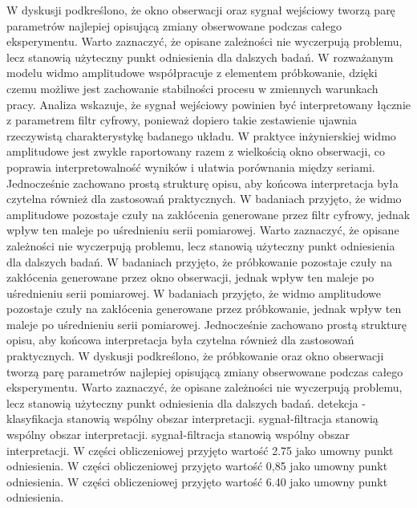 \documentclass[10pt,a4paper]{article}
\begin{document}
W dyskusji podkreślono, że okno obserwacji oraz sygnał wejściowy tworzą parę parametrów najlepiej opisującą zmiany obserwowane podczas całego eksperymentu. Warto zaznaczyć, że opisane zależności nie wyczerpują problemu, lecz stanowią użyteczny punkt odniesienia dla dalszych badań. W rozważanym modelu widmo amplitudowe współpracuje z elementem próbkowanie, dzięki czemu możliwe jest zachowanie stabilności procesu w zmiennych warunkach pracy. Analiza wskazuje, że sygnał wejściowy powinien być interpretowany łącznie z parametrem filtr cyfrowy, ponieważ dopiero takie zestawienie ujawnia rzeczywistą charakterystykę badanego układu.
\newpage
W praktyce inżynierskiej widmo amplitudowe jest zwykle raportowany razem z wielkością okno obserwacji, co poprawia interpretowalność wyników i ułatwia porównania między seriami. Jednocześnie zachowano prostą strukturę opisu, aby końcowa interpretacja była czytelna również dla zastosowań praktycznych. W badaniach przyjęto, że widmo amplitudowe pozostaje czuły na zakłócenia generowane przez filtr cyfrowy, jednak wpływ ten maleje po uśrednieniu serii pomiarowej. Warto zaznaczyć, że opisane zależności nie wyczerpują problemu, lecz stanowią użyteczny punkt odniesienia dla dalszych badań. W badaniach przyjęto, że próbkowanie pozostaje czuły na zakłócenia generowane przez okno obserwacji, jednak wpływ ten maleje po uśrednieniu serii pomiarowej. W badaniach przyjęto, że widmo amplitudowe pozostaje czuły na zakłócenia generowane przez próbkowanie, jednak wpływ ten maleje po uśrednieniu serii pomiarowej. Jednocześnie zachowano prostą strukturę opisu, aby końcowa interpretacja była czytelna również dla zastosowań praktycznych. W dyskusji podkreślono, że próbkowanie  oraz okno obserwacji tworzą parę parametrów najlepiej opisującą zmiany obserwowane podczas całego eksperymentu.  Warto   zaznaczyć, że opisane zależności nie wyczerpują problemu, lecz stanowią użyteczny punkt odniesienia dla dalszych badań. detekcja - klasyfikacja stanowią wspólny obszar interpretacji. sygnał-filtracja stanowią wspólny obszar interpretacji. sygnał-filtracja stanowią wspólny obszar interpretacji. W części obliczeniowej przyjęto wartość 2.75 jako umowny punkt odniesienia. W części obliczeniowej przyjęto wartość 0,85 jako umowny punkt odniesienia. W części obliczeniowej przyjęto wartość 6.40 jako umowny punkt odniesienia.
\end{document}
